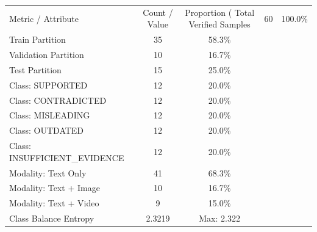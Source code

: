 \begin{tabular}{lcc}
\hline
Metric / Attribute & Count / Value & Proportion (%
\hline
Total Verified Samples & 60 & 100.0\% \\
Train Partition & 35 & 58.3\% \\
Validation Partition & 10 & 16.7\% \\
Test Partition & 15 & 25.0\% \\
Class: SUPPORTED & 12 & 20.0\% \\
Class: CONTRADICTED & 12 & 20.0\% \\
Class: MISLEADING & 12 & 20.0\% \\
Class: OUTDATED & 12 & 20.0\% \\
Class: INSUFFICIENT\_EVIDENCE & 12 & 20.0\% \\
Modality: Text Only & 41 & 68.3\% \\
Modality: Text + Image & 10 & 16.7\% \\
Modality: Text + Video & 9 & 15.0\% \\
Class Balance Entropy & 2.3219 & Max: 2.322 \\
\hline
\end{tabular}
